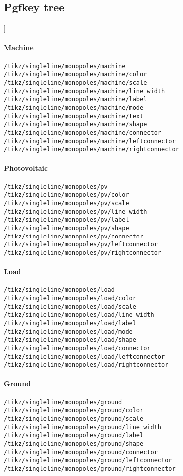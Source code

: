 \documentclass[a4]{article}
\begin{document}
\subsection{Pgfkey tree}]
\begin{footnotesize}
\paragraph{Machine}
\begin{verbatim}
/tikz/singleline/monopoles/machine
/tikz/singleline/monopoles/machine/color
/tikz/singleline/monopoles/machine/scale
/tikz/singleline/monopoles/machine/line width
/tikz/singleline/monopoles/machine/label
/tikz/singleline/monopoles/machine/mode
/tikz/singleline/monopoles/machine/text
/tikz/singleline/monopoles/machine/shape
/tikz/singleline/monopoles/machine/connector
/tikz/singleline/monopoles/machine/leftconnector
/tikz/singleline/monopoles/machine/rightconnector
\end{verbatim}
\paragraph{Photovoltaic}
\begin{verbatim}
/tikz/singleline/monopoles/pv
/tikz/singleline/monopoles/pv/color
/tikz/singleline/monopoles/pv/scale
/tikz/singleline/monopoles/pv/line width
/tikz/singleline/monopoles/pv/label
/tikz/singleline/monopoles/pv/shape
/tikz/singleline/monopoles/pv/connector
/tikz/singleline/monopoles/pv/leftconnector
/tikz/singleline/monopoles/pv/rightconnector
\end{verbatim}
\paragraph{Load}
\begin{verbatim}
/tikz/singleline/monopoles/load
/tikz/singleline/monopoles/load/color
/tikz/singleline/monopoles/load/scale
/tikz/singleline/monopoles/load/line width
/tikz/singleline/monopoles/load/label
/tikz/singleline/monopoles/load/mode
/tikz/singleline/monopoles/load/shape
/tikz/singleline/monopoles/load/connector
/tikz/singleline/monopoles/load/leftconnector
/tikz/singleline/monopoles/load/rightconnector
\end{verbatim}
\paragraph{Ground}
\begin{verbatim}
/tikz/singleline/monopoles/ground
/tikz/singleline/monopoles/ground/color
/tikz/singleline/monopoles/ground/scale
/tikz/singleline/monopoles/ground/line width
/tikz/singleline/monopoles/ground/label
/tikz/singleline/monopoles/ground/shape
/tikz/singleline/monopoles/ground/connector
/tikz/singleline/monopoles/ground/leftconnector
/tikz/singleline/monopoles/ground/rightconnector
\end{verbatim}

\end{footnotesize}
\end{document}
